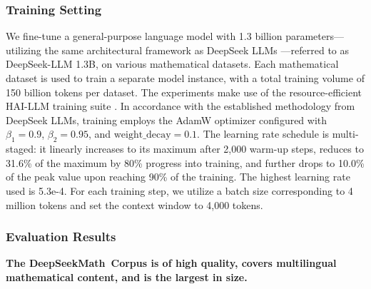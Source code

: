 \begin{itemize}[topsep=0pt]
\subsubsection{Training Setting}
\label{sec:quality-policy}
We fine-tune a general-purpose language model with 1.3 billion parameters—utilizing the same architectural framework as DeepSeek LLMs \citep{deepseek-llm}—referred to as DeepSeek-LLM 1.3B, on various mathematical datasets. Each mathematical dataset is used to train a separate model instance, with a total training volume of 150 billion tokens per dataset. The experiments make use of the resource-efficient HAI-LLM training suite \citep{haillm}. In accordance with the established methodology from DeepSeek LLMs, training employs the AdamW optimizer \citep{adamW} configured with $\beta_1=0.9$, $\beta_2=0.95$, and $\mathrm{weight\_decay}=0.1$. The learning rate schedule is multi-staged: it linearly increases to its maximum after 2,000 warm-up steps, reduces to 31.6\% of the maximum by 80\% progress into training, and further drops to 10.0\% of the peak value upon reaching 90\% of the training. The highest learning rate used is 5.3e-4. For each training step, we utilize a batch size corresponding to 4 million tokens and set the context window to 4,000 tokens.

\subsubsection{Evaluation Results}

\textbf{The DeepSeekMath~Corpus is of high quality, covers multilingual mathematical content, and is the largest in size.}


\end{itemize}
